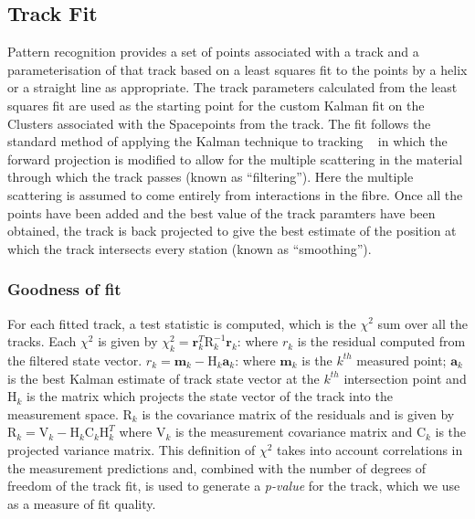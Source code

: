    \subsection{Track Fit}
   \label{subsec:FinalTrackFit}
   Pattern recognition provides a set of points associated with a track and a parameterisation of that track based on a least squares fit to the points by a helix or a straight line as appropriate. The track parameters calculated from the least squares fit are used as the starting point for the custom Kalman fit on the Clusters associated with the Spacepoints from the track. The fit follows the standard method of applying the Kalman technique to tracking ~\cite{Fruhwirth,Billoir} in which the forward projection is modified to allow for the multiple scattering in the material through which the track passes (known as ``filtering''). Here the multiple scattering is assumed to come entirely from interactions in the fibre. Once all the points have been added and the best value of the track paramters have been obtained, the track is back projected to give the best estimate of the position at which the track intersects every station (known as ``smoothing'').

    \subsubsection{Goodness of fit}
    For each fitted track, a test statistic is computed, which is the $\chi^2$ sum over all the tracks. Each $\chi^2$ is given by $\chi_{k}^{2}=\mathbf{r}_{k}^{T}\mathrm{R}_{k}^{-1}\mathbf{r}_{k}$: where $r_{k}$ is the residual computed from the filtered state vector. $r_{k}=\mathbf{m}_{k}-\mathrm{H}_{k}\mathbf{a}_{k}$: where $\mathbf{m}_{k}$ is the $k^{th}$  measured point; $\mathbf{a}_{k}$ is the best Kalman estimate of track state vector at the $k^{th}$ intersection point and $\mathrm{H}_{k}$ is the matrix which projects the state vector of the track into the measurement space. $\mathrm{R}_{k}$ is the covariance matrix of the residuals and is given by  $\mathrm{R}_{k}=\mathrm{V}_{k}-\mathrm{H}_{k}\mathrm{C}_{k}\mathrm{H}_{k}^{T}$ where $\mathrm{V}_{k}$ is the measurement covariance matrix and $\mathrm{C}_{k}$ is the projected variance matrix. This definition of  $\chi^{2}$  takes into account correlations in the measurement predictions and, combined with the number of degrees of freedom of the track fit, is used to generate a {\it p-value} for the track, which we use as a measure of fit quality.





  